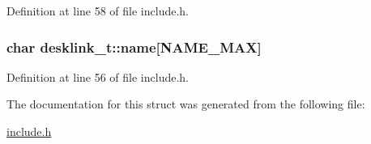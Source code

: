Definition at line 58 of file include.\-h.

\hypertarget{structdesklink__t_aff78ef2e29eaf6152f7586605dff6feb}{
\subsubsection[{name}]{\setlength{\rightskip}{0pt plus 5cm}char desklink\-\_\-t\-::name\mbox{[}N\-A\-M\-E\-\_\-\-M\-A\-X\mbox{]}}}\label{structdesklink__t_aff78ef2e29eaf6152f7586605dff6feb}


Definition at line 56 of file include.\-h.



The documentation for this struct was generated from the following file\-:\begin{DoxyCompactItemize}
\item 
\hyperlink{include_8h}{include.\-h}\end{DoxyCompactItemize}

